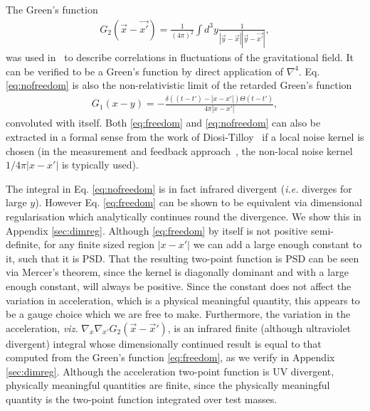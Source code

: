 \documentclass[aps,preprintnumbers,superscriptaddress,longbibliography]{revtex4-1}
\begin{document}
The Green's function 
\begin{align}
    G_2(\vec{x}-\vec{x'})=\frac{1}{(4\pi)^2}\int d^3y \frac{1}{|\vec{y}-\vec{x}||\vec{y}-\vec{x'}|},
    \label{eq:nofreedom}
\end{align}
was used in~\cite{oppenheim2022gravitationally} to describe correlations in fluctuations of the gravitational field. It can be verified to be a Green's function by direct application of $\nabla^4$. 
%
Eq. \eqref{eq:nofreedom} is also the non-relativistic limit of the retarded Green's function 
\begin{align}
    G_1(x-y)=-\frac{\delta((t-t')-|x-x'|)\Theta(t-t')}{4\pi |x-x'|},
\end{align}
convoluted with itself.
%
Both \eqref{eq:freedom} and \eqref{eq:nofreedom} can also be extracted in a formal sense from the work of Diosi-Tilloy~\cite{tilloy2017principle} if a local noise kernel is chosen (in the measurement and feedback approach~\cite{kafri2014classical,tilloy2016sourcing,tilloy2017principle}, the non-local noise kernel $1/4\pi |x-x'|$ is typically used). 

The integral in Eq. \eqref{eq:nofreedom} is in fact infrared divergent (\textit{i.e.} diverges for large $y$). However Eq. \eqref{eq:freedom} can be shown to be equivalent via dimensional regularisation which analytically continues round the divergence. We show this in Appendix \ref{sec:dimreg}. Although \eqref{eq:freedom} by itself is not positive semi-definite, for any finite sized region $|x-x'|$ we can add a large enough constant to it, such that it is PSD. That the resulting two-point function is PSD can be seen via Mercer's theorem, since the kernel is diagonally dominant and with a large enough constant, will always be positive. Since the constant does not affect the variation in acceleration, which is a physical meaningful quantity, this appears to be a gauge choice which we are free to make. %
Furthermore, the variation in the acceleration, \textit{viz.} $\nabla_x \nabla_{x'} G_2(\vec{x}-\vec{x}')$, is an infrared finite (although ultraviolet divergent) integral whose dimensionally continued  result is equal to that computed from the Green's function \eqref{eq:freedom}, as we verify in Appendix \ref{sec:dimreg}.
Although the acceleration two-point function is UV divergent, physically meaningful quantities are finite, since the physically meaningful quantity is the two-point function integrated over test masses\cite{oppenheim2022gravitationally,UCLDMDNE}.
\end{document}
